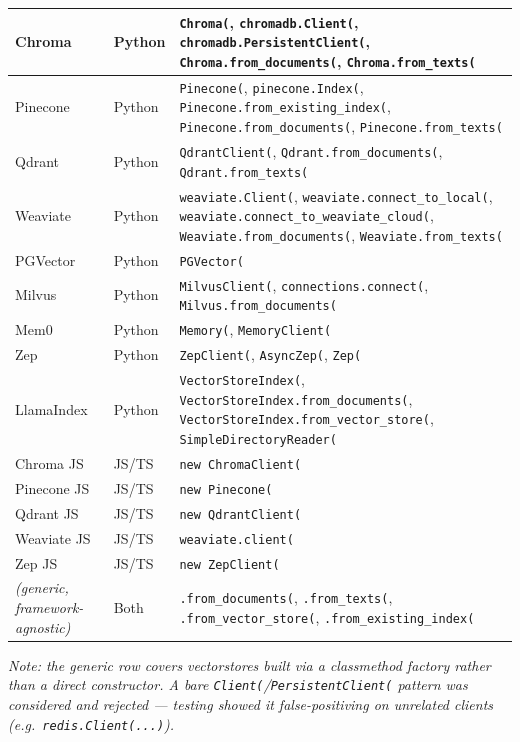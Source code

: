 {\begin{longtable}{@{}p{}p{}p{}@{}}
Chroma & Python & \texttt{Chroma(}, \texttt{chromadb.Client(}, \texttt{chromadb.PersistentClient(}, \texttt{Chroma.from\_documents(}, \texttt{Chroma.from\_texts(} \\ \midrule
Pinecone & Python & \texttt{Pinecone(}, \texttt{pinecone.Index(}, \texttt{Pinecone.from\_existing\_index(}, \texttt{Pinecone.from\_documents(}, \texttt{Pinecone.from\_texts(} \\ \midrule
Qdrant & Python & \texttt{QdrantClient(}, \texttt{Qdrant.from\_documents(}, \texttt{Qdrant.from\_texts(} \\ \midrule
Weaviate & Python & \texttt{weaviate.Client(}, \texttt{weaviate.connect\_to\_local(}, \texttt{weaviate.connect\_to\_weaviate\_cloud(}, \texttt{Weaviate.from\_documents(}, \texttt{Weaviate.from\_texts(} \\ \midrule
PGVector & Python & \texttt{PGVector(} \\ \midrule
Milvus & Python & \texttt{MilvusClient(}, \texttt{connections.connect(}, \texttt{Milvus.from\_documents(} \\ \midrule
Mem0 & Python & \texttt{Memory(}, \texttt{MemoryClient(} \\ \midrule
Zep & Python & \texttt{ZepClient(}, \texttt{AsyncZep(}, \texttt{Zep(} \\ \midrule
LlamaIndex & Python & \texttt{VectorStoreIndex(}, \texttt{VectorStoreIndex.from\_documents(}, \texttt{VectorStoreIndex.from\_vector\_store(}, \texttt{SimpleDirectoryReader(} \\ \midrule
Chroma JS & JS/TS & \texttt{new ChromaClient(} \\ \midrule
Pinecone JS & JS/TS & \texttt{new Pinecone(} \\ \midrule
Qdrant JS & JS/TS & \texttt{new QdrantClient(} \\ \midrule
Weaviate JS & JS/TS & \texttt{weaviate.client(} \\ \midrule
Zep JS & JS/TS & \texttt{new ZepClient(} \\ \midrule
\textit{(generic, framework-agnostic)} & Both & \texttt{.from\_documents(}, \texttt{.from\_texts(}, \texttt{.from\_vector\_store(}, \texttt{.from\_existing\_index(} \\ \midrule

\end{longtable}
}
\textit{Note: the generic row covers vectorstores built via a classmethod factory rather than a direct constructor. A bare \texttt{Client(}/\texttt{PersistentClient(} pattern was considered and rejected --- testing showed it false-positiving on unrelated clients (e.g.\ \texttt{redis.Client(...)}).}


